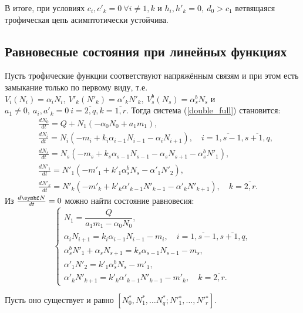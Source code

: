 В итоге, при условиях \(c_i, c'_k = 0 ~ \forall i \neq 1, k\) и \( h_i, h'_k = 0, ~ d_0 > c_1\) ветвящаяся трофическая цепь асимптотически устойчива.


\subsection{Равновесные состояния при линейных функциях}
Пусть трофические функции соответствуют напряжённым связям и при этом есть замыкание только по первому виду, т.е. \(V_i(N_i) = \alpha_i N_i, ~ V'_k(N'_k) = \alpha'_k N'_k, ~ V^b_s(N_s) = \alpha^b_s N_s\) и \( a_1 \neq 0, ~ a_i, a'_k = 0 ~ i=\overline{2,q}, k=\overline{1,r}\). Тогда система (\ref{double_full}) становится:
\begin{equation} \label{double_lin}
    \begin{split}
        & \frac{d N_0}{dt} = Q + N_1 ( -\alpha_0 N_0 + a_1 m_1 ), \\
        & \frac{d N_i}{dt} = N_i (-m_i + k_i \alpha_{i-1} N_{i-1} - \alpha_i N_{i+1}), \quad i=\overline{1,s-1},  \overline{s+1,q}, \\
        & \frac{d N_s}{dt} = N_s ( -m_s + k_s \alpha_{s-1} N_{s-1} - \alpha_s N_{s+1} - \alpha_s^b N'_1 ), \\
        & \frac{d N'_1}{dt} = N'_1 ( -m'_1 + k'_1 \alpha_s^b N_s - \alpha'_1 N'_{2} ), \\
        & \frac{d N'_k}{dt} = N'_k ( -m'_k + k'_k \alpha'_{k-1} N'_{k-1} - \alpha'_k N'_{k+1} ), \quad k=\overline{2,r}.
    \end{split}
\end{equation}
Из \( \frac{d \mb{N}}{dt} = 0 \) можно найти состояние равновесия:
\begin{equation} \label{double_stab_system}
    \begin{cases}
        N_1 = \dfrac{Q}{ a_1 m_1 - \alpha_0 N_0 }, \\
        \alpha_i N_{i+1} = k_i \alpha_{i-1} N_{i-1} -m_i , \quad i=\overline{1,s-1},  \overline{s+1,q}, \\
        \alpha_s^b N'_1 + \alpha_s N_{s+1} = k_s \alpha_{s-1} N_{s-1}  -m_s , \\
        \alpha'_1 N'_{2} = k'_1 \alpha_s^b N_s -m'_1, \\
        \alpha'_k N'_{k+1} = k'_k \alpha'_{k-1} N'_{k-1} -m'_k, \quad k=\overline{2,r}.
    \end{cases}
\end{equation}

Пусть оно существует и равно \( [N^*_0, N^*_1, \dots N^*_q; N'{}^*_1, \dots, N'{}^*_r] \).


